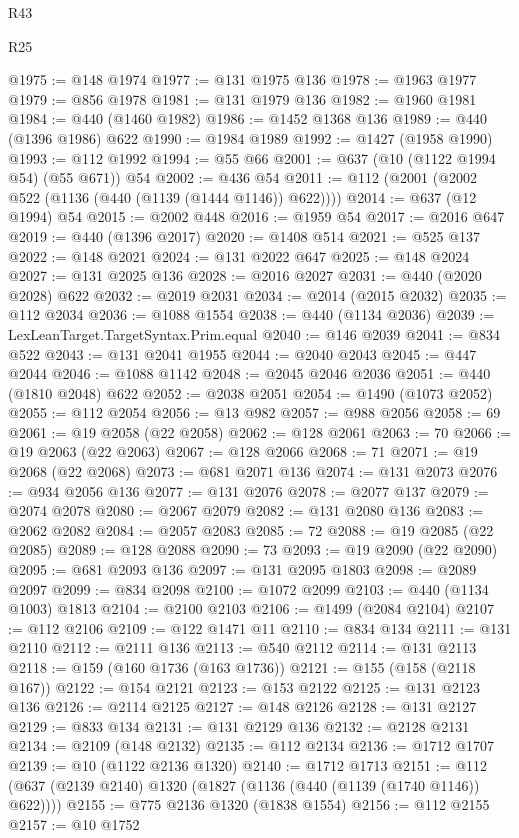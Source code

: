\begin{lexlean}{R43}
\begin{lexlean}{R25}
\begin{coremodule}
{{{{{{{{{{{{{{{{{{{{{{{{{{{{{{{{{{{{{{{{{{{{{{{{{{{{{{{{{{{{{{{{{{{{{{{{{{{{{{{{{{{{{{{{{{{{{{{{{{{{{{{{{{{{{{{{{{{{{{{{{{{{{{{{{{{{{{{{{{{{{{{{{{{{{{{{{{{{{{{{{{{{{{{{{{{{{{{{{{{{{{{{{{{{{{{{{@1975 := @148 @1974
@1977 := @131 @1975 @136
@1978 := @1963 @1977
@1979 := @856 @1978
@1981 := @131 @1979 @136
@1982 := @1960 @1981
@1984 := @440 (@1460 @1982)
@1986 := @1452 @1368 @136
@1989 := @440 (@1396 @1986) @622
@1990 := @1984 @1989
@1992 := @1427 (@1958 @1990)
@1993 := @112 @1992
@1994 := @55 @66
@2001 := @637 (@10 (@1122 @1994 @54) (@55 @671)) @54
@2002 := @436 @54
@2011 := @112 (@2001 (@2002 @522 (@1136 (@440 (@1139 (@1444 @1146)) @622))))
@2014 := @637 (@12 @1994) @54
@2015 := @2002 @448
@2016 := @1959 @54
@2017 := @2016 @647
@2019 := @440 (@1396 @2017)
@2020 := @1408 @514
@2021 := @525 @137
@2022 := @148 @2021
@2024 := @131 @2022 @647
@2025 := @148 @2024
@2027 := @131 @2025 @136
@2028 := @2016 @2027
@2031 := @440 (@2020 @2028) @622
@2032 := @2019 @2031
@2034 := @2014 (@2015 @2032)
@2035 := @112 @2034
@2036 := @1088 @1554
@2038 := @440 (@1134 @2036)
@2039 := LexLeanTarget.TargetSyntax.Prim.equal
@2040 := @146 @2039
@2041 := @834 @522
@2043 := @131 @2041 @1955
@2044 := @2040 @2043
@2045 := @447 @2044
@2046 := @1088 @1142
@2048 := @2045 @2046 @2036
@2051 := @440 (@1810 @2048) @622
@2052 := @2038 @2051
@2054 := @1490 (@1073 @2052)
@2055 := @112 @2054
@2056 := @13 @982
@2057 := @988 @2056
@2058 := 69
@2061 := @19 @2058 (@22 @2058)
@2062 := @128 @2061
@2063 := 70
@2066 := @19 @2063 (@22 @2063)
@2067 := @128 @2066
@2068 := 71
@2071 := @19 @2068 (@22 @2068)
@2073 := @681 @2071 @136
@2074 := @131 @2073
@2076 := @934 @2056 @136
@2077 := @131 @2076
@2078 := @2077 @137
@2079 := @2074 @2078
@2080 := @2067 @2079
@2082 := @131 @2080 @136
@2083 := @2062 @2082
@2084 := @2057 @2083
@2085 := 72
@2088 := @19 @2085 (@22 @2085)
@2089 := @128 @2088
@2090 := 73
@2093 := @19 @2090 (@22 @2090)
@2095 := @681 @2093 @136
@2097 := @131 @2095 @1803
@2098 := @2089 @2097
@2099 := @834 @2098
@2100 := @1072 @2099
@2103 := @440 (@1134 @1003) @1813
@2104 := @2100 @2103
@2106 := @1499 (@2084 @2104)
@2107 := @112 @2106
@2109 := @122 @1471 @11
@2110 := @834 @134
@2111 := @131 @2110
@2112 := @2111 @136
@2113 := @540 @2112
@2114 := @131 @2113
@2118 := @159 (@160 @1736 (@163 @1736))
@2121 := @155 (@158 (@2118 @167))
@2122 := @154 @2121
@2123 := @153 @2122
@2125 := @131 @2123 @136
@2126 := @2114 @2125
@2127 := @148 @2126
@2128 := @131 @2127
@2129 := @833 @134
@2131 := @131 @2129 @136
@2132 := @2128 @2131
@2134 := @2109 (@148 @2132)
@2135 := @112 @2134
@2136 := @1712 @1707
@2139 := @10 (@1122 @2136 @1320)
@2140 := @1712 @1713
@2151 := @112 (@637 (@2139 @2140) @1320 (@1827 (@1136 (@440 (@1139 (@1740 @1146)) @622))))
@2155 := @775 @2136 @1320 (@1838 @1554)
@2156 := @112 @2155
@2157 := @10 @1752
}}}}}}}}}}}}}}}}}}}}}}}}}}}}}}}}}}}}}}}}}}}}}}}}}}}}}}}}}}}}}}}}}}}}}}}}}}}}}}}}}}}}}}}}}}}}}}}}}}}}}}}}}}}}}}}}}}}}}}}}}}}}}}}}}}}}}}}}}}}}}}}}}}}}}}}}}}}}}}}}}}}}}}}}}}}}}}}}}}}}}}}}}}}}}}}}}
\end{coremodule}
\end{lexlean}
\end{lexlean}
